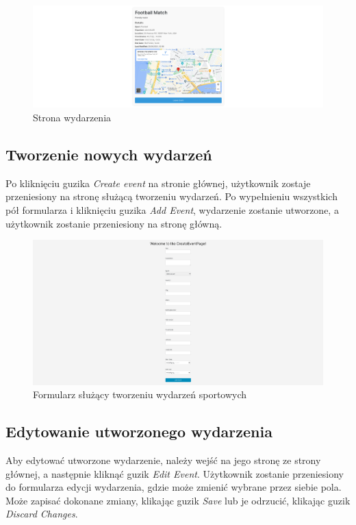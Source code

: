 \documentclass[11pt,a4paper]{article}
\begin{document}
\begin{figure} [H]
    \centering
    \includegraphics[width=1\linewidth]{pages/event_leave.png}
    \caption{Strona wydarzenia}
\end{figure}

\subsection{Tworzenie nowych wydarzeń}

Po kliknięciu guzika \textit{Create event} na stronie głównej, użytkownik zostaje przeniesiony na stronę służącą tworzeniu wydarzeń. Po wypełnieniu wszystkich pół formularza i kliknięciu guzika \textit{Add Event}, wydarzenie zostanie utworzone, a użytkownik zostanie przeniesiony na stronę główną.

\begin{figure} [H]
    \centering
    \includegraphics[width=1\linewidth]{pages/create_event.png}
    \caption{Formularz służący tworzeniu wydarzeń sportowych}
\end{figure}

\subsection{Edytowanie utworzonego wydarzenia}

Aby edytować utworzone wydarzenie, należy wejść na jego stronę ze strony głównej, a następnie kliknąć guzik \textit{Edit Event}. Użytkownik zostanie przeniesiony do formularza edycji wydarzenia, gdzie może zmienić wybrane przez siebie pola. Może zapisać dokonane zmiany, klikając guzik \textit{Save} lub je odrzucić, klikając guzik \textit{Discard Changes}.
\end{document}
